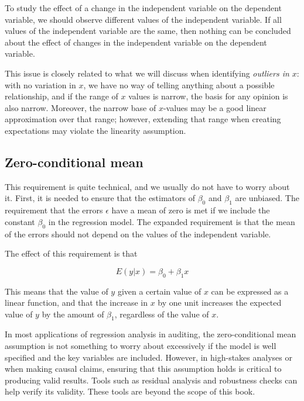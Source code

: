 To study the effect of a change in the independent variable on the dependent variable, we should observe different values of the independent variable. If all values of the independent variable are the same, then nothing can be concluded about the effect of changes in the independent variable on the dependent variable.

This issue is closely related to what we will discuss when identifying \emph{outliers in $x$}: with no variation in $x$, we have no way of telling anything about a possible relationship, and if the range of $x$ values is narrow, the basis for any opinion is also narrow. Moreover, the narrow base of $x$-values may be a good linear approximation over that range; however, extending that range when creating expectations may violate the linearity assumption.


\subsection{Zero-conditional mean} %
\label{sub:zero_conditional_mean}

This requirement is quite technical, and we usually do not have to worry about it. First, it is needed to ensure that the estimators of $\beta_0$ and $\beta_1$ are unbiased. The requirement that the errors $\epsilon$ have a mean of zero is met if we include the constant $\beta_0$ in the regression model. The expanded requirement is that the mean of the errors should not depend on the values of the independent variable. 

The effect of this requirement is that

\begin{equation}
E(y | x) = \beta_0 + \beta_1x
\end{equation}

This means that the value of $y$ given a certain value of $x$ can be expressed as a linear function, and that the increase in $x$ by one unit increases the expected value of $y$ by the amount of $\beta_1$, regardless of the value of $x$.

In most applications of regression analysis in auditing, the zero-conditional mean assumption is not something to worry about excessively if the model is well specified and the key variables are included. However, in high-stakes analyses or when making causal claims, ensuring that this assumption holds is critical to producing valid results. Tools such as residual analysis and robustness checks can help verify its validity. These tools are beyond the scope of this book.

